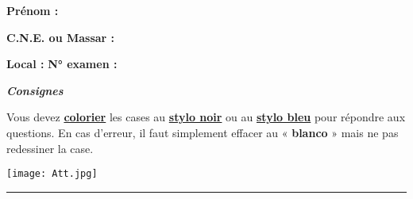 \documentclass[a3paper,landscape,10pt]{article}
\newcommand{\tmtextbf}[1]{{\bfseries{#1}}}
\begin{document}
{\begin{multicols}{3}
{\begin{center}
\begin{minipage}[b]{11cm}
{{\begin{minipage}{.9\linewidth}
\tmtextbf{Prénom :}
\vspace*{.5cm}\dotfill

\tmtextbf{C.N.E. ou Massar :}
\vspace*{.5cm}\dotfill

\tmtextbf{Local :}
\vspace*{.2cm}\dotfill
\tmtextbf{N° examen :}
\dotfill

\end{minipage}
}}\hfill\vspace{-1ex}\end{minipage}\hspace*{\fill}
\end{center}
}


\end{multicols}

\begin{center}\em
\begin{center} \large \bf \emph{Consignes} \end{center}
\begin{center}
Vous devez   \textbf{ \underline{colorier}} les cases au \textbf{\underline{stylo noir}} ou au \textbf{\underline{stylo bleu}} pour répondre aux questions.
En cas d'erreur, il faut simplement effacer au « \textbf{blanco} » mais ne pas redessiner la case.
\end{center}
\end{center}

\begin{center}
\begin{minipage}[c]{.2\linewidth}
\texttt{[image: Att.jpg]}
\end{minipage}
\end{center}

\hrule\vspace{0.2ex}

\begin{multicols}{3}
\columnseprule=1.0pt






\end{multicols}

}
\end{document}
